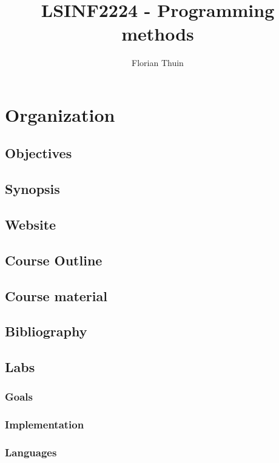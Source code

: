 \documentclass[12pt, a4paper]{book}
\author{Florian Thuin}
\title{LSINF2224 - Programming methods}
\begin{document}
    \maketitle
    \tableofcontents
  \section{Organization}
  \label{sec:Organization}

  \subsection{Objectives}
  \label{sub:Objectives}
  \subsection{Synopsis}
  \label{sub:Synopsis}
  \subsection{Website}
  \label{sub:Website}
  \subsection{Course Outline}
  \label{sub:Course Outline}
  \subsection{Course material}
  \label{sub:Course material}
  \subsection{Bibliography}
  \label{sub:Bibliography}
  \subsection{Labs}
  \label{sub:Labs}
  \subsubsection{Goals}
  \label{subs:Goals}
  \subsubsection{Implementation}
  \label{subs:Implementation}
  \subsubsection{Languages}
  \label{subs:Languages}
\end{document}
